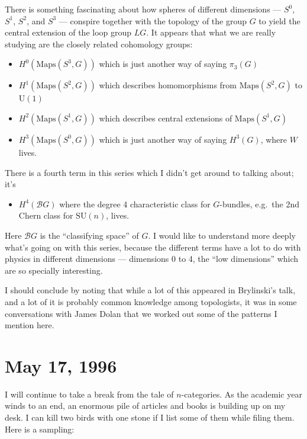 \documentclass{article}
\def\tightlist{}
\begin{document}
There is something fascinating about how spheres of different dimensions
--- \(S^0\), \(S^1\), \(S^2\), and \(S^3\) --- conspire together with
the topology of the group \(G\) to yield the central extension of the
loop group \(LG\). It appears that what we are really studying are the
closely related cohomology groups:

\begin{itemize}
\tightlist
\item
  \(H^0(\mathrm{Maps}(S^3,G))\) which is just another way of saying
  \(\pi_3(G)\)
\item
  \(H^1(\mathrm{Maps}(S^2,G))\) which describes homomorphisms from
  \(\mathrm{Maps}(S^2,G)\) to \(\mathrm{U}(1)\)
\item
  \(H^2(\mathrm{Maps}(S^1,G))\) which describes central extensions of
  \(\mathrm{Maps}(S^1,G)\)
\item
  \(H^3(\mathrm{Maps}(S^0,G))\) which is just another way of saying
  \(H^3(G)\), where \(W\) lives.
\end{itemize}

There is a fourth term in this series which I didn't get around to
talking about; it's

\begin{itemize}
\tightlist
\item
  \(H^4(\mathcal{B}G)\) where the degree 4 characteristic class for
  \(G\)-bundles, e.g.~the 2nd Chern class for \(\mathrm{SU}(n)\), lives.
\end{itemize}

Here \(\mathcal{B}G\) is the ``classifying space'' of \(G\). I would
like to understand more deeply what's going on with this series, because
the different terms have a lot to do with physics in different
dimensions --- dimensions 0 to 4, the ``low dimensions'' which are so
specially interesting.

I should conclude by noting that while a lot of this appeared in
Brylinski's talk, and a lot of it is probably common knowledge among
topologists, it was in some conversations with James Dolan that we
worked out some of the patterns I mention here.
\hypertarget{week82}{%
\section{May 17, 1996}\label{week82}}

I will continue to take a break from the tale of \(n\)-categories. As
the academic year winds to an end, an enormous pile of articles and
books is building up on my desk. I can kill two birds with one stone if
I list some of them while filing them. Here is a sampling:
\end{document}
